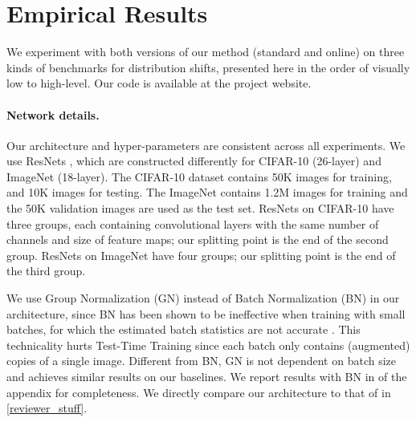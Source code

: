 \section{Empirical Results}
\label{results}
We experiment with both versions of our method (standard and online) on three kinds of benchmarks for distribution shifts, presented here in the order of visually low to high-level.
Our code is available at the project website.


\paragraph{Network details.}
Our architecture and hyper-parameters are consistent across all experiments.  We use ResNets \citep{he2016identity}, which are constructed differently for CIFAR-10 \citep{krizhevsky2009learning} (26-layer) and ImageNet \citep{ILSVRC15} (18-layer). The CIFAR-10 dataset contains 50K images for training, and 10K images for testing. The ImageNet contains 1.2M images for training and the 50K validation images are used as the test set. ResNets on CIFAR-10 have three groups, each containing convolutional layers with the same number of channels and size of feature maps; our splitting point is the end of the second group. ResNets on ImageNet have four groups;  our splitting point is the end of the third group. 

We use Group Normalization (GN) instead of Batch Normalization (BN) in our architecture, since BN has been shown to be ineffective when training with small batches, for which the estimated batch statistics are not accurate \citep{ioffe2015batch}. This technicality hurts Test-Time Training since each batch only contains (augmented) copies of a single image. Different from BN, GN is not dependent on batch size and achieves similar results on our baselines. We report results with BN in  of the appendix for completeness. 
We directly compare our architecture to that of \citet{hendrycks2018using} in \autoref{reviewer_stuff}.


